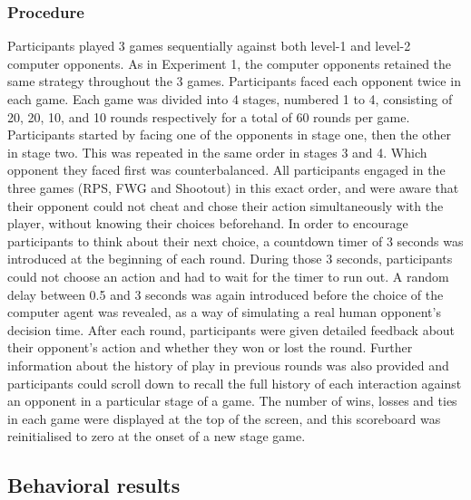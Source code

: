 \documentclass[smallextended]{svjour3}       %
\begin{document}
\hypertarget{procedure-1}{%
\subsubsection{Procedure}\label{procedure-1}}

Participants played 3 games sequentially against both level-1 and
level-2 computer opponents. As in Experiment 1, the computer opponents
retained the same strategy throughout the 3 games. Participants faced
each opponent twice in each game. Each game was divided into 4 stages,
numbered 1 to 4, consisting of 20, 20, 10, and 10 rounds respectively
for a total of 60 rounds per game. Participants started by facing one of
the opponents in stage one, then the other in stage two. This was
repeated in the same order in stages 3 and 4. Which opponent they faced
first was counterbalanced. All participants engaged in the three games
(RPS, FWG and Shootout) in this exact order, and were aware that their
opponent could not cheat and chose their action simultaneously with the
player, without knowing their choices beforehand. In order to encourage
participants to think about their next choice, a countdown timer of 3
seconds was introduced at the beginning of each round. During those 3
seconds, participants could not choose an action and had to wait for the
timer to run out. A random delay between 0.5 and 3 seconds was again
introduced before the choice of the computer agent was revealed, as a
way of simulating a real human opponent's decision time. After each
round, participants were given detailed feedback about their opponent's
action and whether they won or lost the round. Further information about
the history of play in previous rounds was also provided and
participants could scroll down to recall the full history of each
interaction against an opponent in a particular stage of a game. The
number of wins, losses and ties in each game were displayed at the top
of the screen, and this scoreboard was reinitialised to zero at the
onset of a new stage game.

\hypertarget{behavioral-results-1}{%
\subsection{Behavioral results}\label{behavioral-results-1}}
\end{document}
